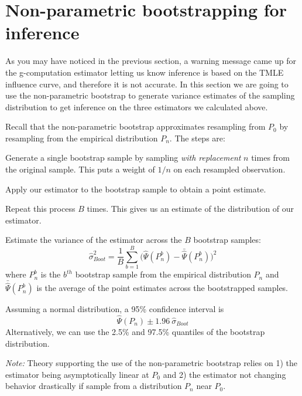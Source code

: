 \documentclass[answers]{exam}
\newenvironment{packed_enum}{
\begin{enumerate}
 \setlength{\itemsep}{0pt}
  \setlength{\parskip}{0pt}
  \setlength{\parsep}{0pt}
}{\end{enumerate}}
\begin{document}
\section{Non-parametric bootstrapping for inference}

As you may have noticed in the previous section, a warning message came up for the g-computation estimator letting us know inference is based on the TMLE influence curve, and therefore it is not accurate. In this section we are going to use the non-parametric bootstrap to generate variance estimates of the sampling distribution to get inference on the three estimators we calculated above.

Recall that the non-parametric bootstrap approximates resampling from $P_0$ by resampling from the empirical distribution $P_n$. The steps are:
\vspace{-1em}
\begin{packed_enum}
\item Generate a single bootstrap sample by sampling \emph{with replacement} $n$ times from the original sample. This puts a weight of $1/n$ on each resampled observation.
\item Apply our estimator to the bootstrap sample to obtain a point estimate.
\item Repeat this process $B$ times. This gives us an estimate of the distribution of our estimator.
\item Estimate the variance of the estimator across the $B$ bootstrap samples: \[
\hat{\sigma}^2_{Boot} = \frac{1}{B} \sum_{b=1}^B \bigg(\hat{\Psi}(P_n^b) - \bar{\hat{\Psi}}(P_n^b) \bigg)^2
\]
where $P_n^b$ is the $b^{th}$ bootstrap sample from the empirical distribution $P_n$ and $\bar{\hat{\Psi}}(P_n^b)$ is the average of the point estimates across the bootstrapped samples.
\item Assuming a normal distribution, a 95\% confidence interval is \[
\hat{\Psi}(P_n) \pm 1.96 \ \hat{\sigma}_{Boot}
\]
Alternatively, we can use the 2.5\% and 97.5\% quantiles of the bootstrap distribution.
\end{packed_enum}
\emph{Note:} Theory supporting the use of the non-parametric bootstrap relies on 1) the estimator being asymptotically linear at $P_0$ and 2) the estimator not changing behavior drastically if sample from a distribution $P_n$ near $P_0$. 
\end{document}
